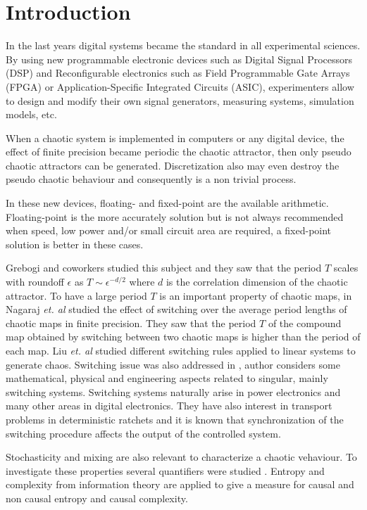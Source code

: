 \section{Introduction} \label{sec:intro}

In the last years digital systems became the standard in all experimental sciences.
By using new programmable electronic devices such as Digital Signal Processors (DSP) and Reconfigurable electronics such as Field Programmable Gate Arrays (FPGA) or Application-Specific Integrated Circuits (ASIC), experimenters allow to design and modify their own signal generators, measuring systems, simulation models, etc.

When a chaotic system is implemented in computers or any digital device, the effect of finite precision became periodic the chaotic attractor, then only pseudo chaotic attractors can be generated.
Discretization also may even destroy the pseudo chaotic behaviour and consequently is a non trivial process.

In these new devices, floating- and fixed-point are the available arithmetic.
Floating-point is the more accurately solution but is not always recommended when speed, low power and/or small circuit area are required, a fixed-point solution is better in these cases.

Grebogi and coworkers \cite{Grebogi1988} studied this subject and they saw that the period $T$ scales with roundoff $\epsilon$ as $T\sim\epsilon^{-d/2}$ where $d$ is the correlation dimension of the chaotic attractor.
To have a large period $T$ is an important property of chaotic maps, in \cite{Nagaraj2008} Nagaraj \textit{et. al} studied the effect of switching over the average period lengths of chaotic maps in finite precision.
They saw that the period $T$ of the compound map obtained by switching between two chaotic maps is higher than the period of each map.
Liu \textit{et. al} \cite{Liu2006} studied different switching rules applied to linear systems to generate chaos.
Switching issue was also addressed in \cite{Gluskin2008}, author considers some mathematical, physical and engineering aspects related to singular, mainly switching systems.
Switching systems naturally arise in power electronics and many other areas in digital electronics.
They have also interest in transport problems in deterministic ratchets \cite{Zarlenga2009} and it is known that synchronization of the switching procedure affects the output of the controlled system.

Stochasticity and mixing are also relevant to characterize a chaotic vehaviour.
To investigate these properties several quantifiers were studied \cite{DeMicco2009}.
Entropy and complexity from information theory are applied to give a measure for causal and non causal entropy and causal complexity.

